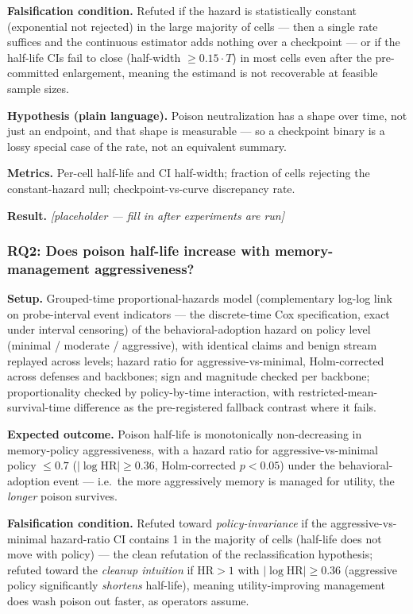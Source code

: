 \documentclass[11pt]{article}
\newcommand{\ph}{\textit{[placeholder --- fill in after experiments are run]}}
\begin{document}
\textbf{Falsification condition.} Refuted if the hazard is statistically constant (exponential not rejected) in the large majority of cells --- then a single rate suffices and the continuous estimator adds nothing over a checkpoint --- or if the half-life CIs fail to close (half-width $\geq 0.15 \cdot T$) in most cells even after the pre-committed enlargement, meaning the estimand is not recoverable at feasible sample sizes.

\textbf{Hypothesis (plain language).} Poison neutralization has a shape over time, not just an endpoint, and that shape is measurable --- so a checkpoint binary is a lossy special case of the rate, not an equivalent summary.

\textbf{Metrics.} Per-cell half-life and CI half-width; fraction of cells rejecting the constant-hazard null; checkpoint-vs-curve discrepancy rate.

\textbf{Result.} \ph

\subsubsection*{RQ2: Does poison half-life increase with memory-management aggressiveness?}

\textbf{Setup.} Grouped-time proportional-hazards model (complementary log-log link on probe-interval event indicators --- the discrete-time Cox specification, exact under interval censoring) of the behavioral-adoption hazard on policy level (minimal / moderate / aggressive), with identical claims and benign stream replayed across levels; hazard ratio for aggressive-vs-minimal, Holm-corrected across defenses and backbones; sign and magnitude checked per backbone; proportionality checked by policy-by-time interaction, with restricted-mean-survival-time difference as the pre-registered fallback contrast where it fails.

\textbf{Expected outcome.} Poison half-life is monotonically non-decreasing in memory-policy aggressiveness, with a hazard ratio for aggressive-vs-minimal policy $\leq 0.7$ ($|\log \text{HR}| \geq 0.36$, Holm-corrected $p < 0.05$) under the behavioral-adoption event --- i.e.\ the more aggressively memory is managed for utility, the \emph{longer} poison survives.

\textbf{Falsification condition.} Refuted toward \emph{policy-invariance} if the aggressive-vs-minimal hazard-ratio CI contains 1 in the majority of cells (half-life does not move with policy) --- the clean refutation of the reclassification hypothesis; refuted toward the \emph{cleanup intuition} if $\text{HR} > 1$ with $|\log \text{HR}| \geq 0.36$ (aggressive policy significantly \emph{shortens} half-life), meaning utility-improving management does wash poison out faster, as operators assume.
\end{document}
